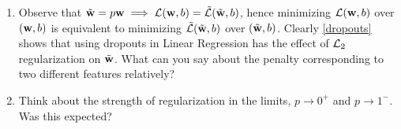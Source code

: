 \begin{enumerate}[label=\alph*)]
\item Observe that $\Tilde{\mathbf{w}} = p\mathbf{w} \implies \mathcal{L}(\mathbf{w}, b) = \Tilde{\mathcal{L}}(\Tilde{\mathbf{w}}, b)$, hence minimizing $\mathcal{L}(\mathbf{w}, b)$ over $(\mathbf{w}, b)$ is equivalent to minimizing  $\Tilde{\mathcal{L}}(\Tilde{\mathbf{w}}, b)$ over $(\Tilde{\mathbf{w}}, b)$. Clearly \autoref{dropouts} shows that using dropouts in Linear Regression has the effect of $\mathcal{L}_{2}$ regularization on $\Tilde{\mathbf{w}}$. What can you say about the penalty corresponding to two different features relatively? 

\item Think about the strength of regularization in the limits, $p \to 0^+$ and $p \to 1^-$. Was this expected?
\end{enumerate}